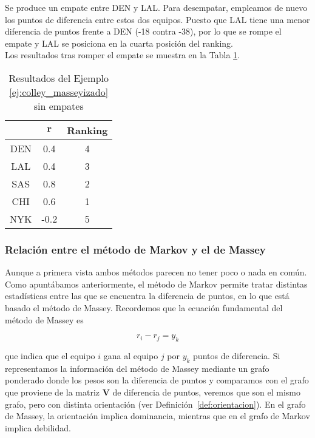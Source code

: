 \begin{ejemplo}
Se produce un empate entre DEN y LAL. Para desempatar, empleamos de nuevo los puntos de diferencia entre estos dos equipos. Puesto que LAL tiene una menor diferencia de puntos frente a DEN (-18 contra -38), por lo que se rompe el empate y LAL se posiciona en la cuarta posición del ranking.\\

Los resultados tras romper el empate se muestra en la Tabla \ref{tbl:colley_masseyizado_sin_empates}.


\begin{table}[h]
\centering
\caption{Resultados del Ejemplo \ref{ej:colley_masseyizado} sin empates}
\label{tbl:colley_masseyizado_sin_empates}
\begin{tabular}{@{}ccc@{}}
\cmidrule(l){2-3}
    & $\mathbf{r}$ & Ranking \\ \midrule
DEN &  0.4      & 4       \\
LAL &  0.4      & 3       \\
SAS &  0.8      & 2       \\
CHI &  0.6      & 1       \\
NYK & -0.2      & 5       \\ \bottomrule
\end{tabular}
\end{table}
\end{ejemplo}

\subsubsection{Relación entre el método de Markov y el de Massey}

Aunque a primera vista ambos métodos parecen no tener poco o nada en común. Como apuntábamos anteriormente, el método de Markov permite tratar distintas estadísticas entre las que se encuentra la diferencia de puntos, en lo que está basado el método de Massey. Recordemos que la ecuación fundamental del método de Massey es

\[ r_i - r_j = y_k \]

que indica que el equipo $i$ gana al equipo $j$ por $y_k$ puntos de diferencia. Si representamos la información del método de Massey mediante un grafo ponderado donde los pesos son la diferencia de puntos y comparamos con el grafo que proviene de la matriz $\mathbf{V}$ de diferencia de puntos, veremos que son el mismo grafo, pero con distinta orientación (ver Definición~\ref{def:orientacion}). En el grafo de Massey, la orientación implica dominancia, mientras que en el grafo de Markov implica debilidad.

